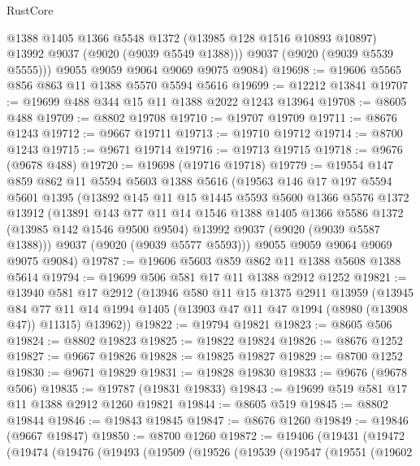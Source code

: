 \begin{lexlean}{RustCore}
\begin{coremodule}
          @1388
          @1405
          @1366
          @5548
          @1372
          (@13985 @128 @1516 @10893 @10897)
          @13992
          @9037
          (@9020 (@9039 @5549 @1388)))
        @9037
        (@9020 (@9039 @5539 @5555)))
      @9055
      @9059
      @9064
      @9069
      @9075
      @9084)
@19698 := @19606 @5565 @856 @863 @11 @1388 @5570 @5594 @5616
@19699 := @12212 @13841
@19707 := @19699 @488 @344 @15 @11 @1388 @2022 @1243 @13964
@19708 := @8605 @488
@19709 := @8802 @19708
@19710 := @19707 @19709
@19711 := @8676 @1243
@19712 := @9667 @19711
@19713 := @19710 @19712
@19714 := @8700 @1243
@19715 := @9671 @19714
@19716 := @19713 @19715
@19718 := @9676 (@9678 @488)
@19720 := @19698 (@19716 @19718)
@19779 := @19554
    @147
    @859
    @862
    @11
    @5594
    @5603
    @1388
    @5616
    (@19563
      @146
      @17
      @197
      @5594
      @5601
      @1395
      (@13892
        @145
        @11
        @15
        @1445
        @5593
        @5600
        @1366
        @5576
        @1372
        @13912
        (@13891
          @143
          @77
          @11
          @14
          @1546
          @1388
          @1405
          @1366
          @5586
          @1372
          (@13985 @142 @1546 @9500 @9504)
          @13992
          @9037
          (@9020 (@9039 @5587 @1388)))
        @9037
        (@9020 (@9039 @5577 @5593)))
      @9055
      @9059
      @9064
      @9069
      @9075
      @9084)
@19787 := @19606 @5603 @859 @862 @11 @1388 @5608 @1388 @5614
@19794 := @19699 @506 @581 @17 @11 @1388 @2912 @1252
@19821 := @13940
    @581
    @17
    @2912
    (@13946
      @580
      @11
      @15
      @1375
      @2911
      @13959
      (@13945
        @84
        @77
        @11
        @14
        @1994
        @1405
        (@13903 @47 @11 @47 @1994 (@8980 (@13908 @47)) @11315)
        @13962))
@19822 := @19794 @19821
@19823 := @8605 @506
@19824 := @8802 @19823
@19825 := @19822 @19824
@19826 := @8676 @1252
@19827 := @9667 @19826
@19828 := @19825 @19827
@19829 := @8700 @1252
@19830 := @9671 @19829
@19831 := @19828 @19830
@19833 := @9676 (@9678 @506)
@19835 := @19787 (@19831 @19833)
@19843 := @19699 @519 @581 @17 @11 @1388 @2912 @1260 @19821
@19844 := @8605 @519
@19845 := @8802 @19844
@19846 := @19843 @19845
@19847 := @8676 @1260
@19849 := @19846 (@9667 @19847)
@19850 := @8700 @1260
@19872 := @19406
    (@19431
      (@19472
        (@19474
          (@19476
            (@19493
              (@19509
                (@19526
                  (@19539
                    (@19547
                      (@19551
                        (@19602

\end{coremodule}
\end{lexlean}
